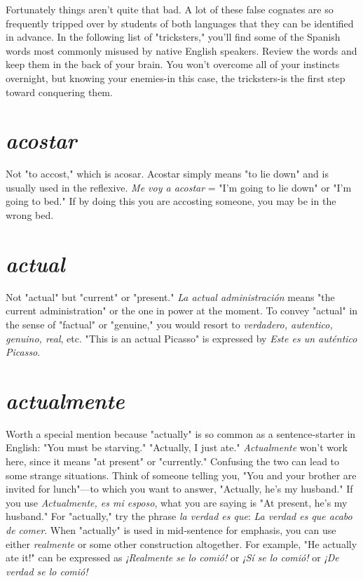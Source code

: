 \documentclass[14pt,a4paper,oneside]{memoir}
\begin{document}
Fortunately things aren't quite that bad. A lot of these false
cognates are so frequently tripped over by students of both languages
that they can be identified in advance. In the following list of "tricksters," you'll find some of the Spanish words most commonly misused
by native English speakers. Review the words and keep them in the
back of your brain. You won't overcome all of your instincts overnight,
but knowing your enemies-in this case, the tricksters-is the first
step toward conquering them.

\section{\emph{acostar}}

Not "to accost," which is acosar. Acostar simply
means "to lie down" and is usually used in the reflexive. \emph{Me voy a
acostar} = "I'm going to lie down" or "I'm going to bed." If by doing
this you are accosting someone, you may be in the wrong bed.

\section{\emph{actual}}

Not "actual" but "current" or "present." \emph{La actual
administración} means "the current administration" or the one in power
at the moment. To convey "actual" in the sense of "factual" or "genuine," you would resort to \emph{verdadero, autentico, genuino, real}, etc. "This
is an actual Picasso" is expressed by \emph{Este es un auténtico Picasso}.

\section{\emph{actualmente}}

Worth a special mention because "actually"
is so common as a sentence-starter in English: "You must be starving."
"Actually, I just ate." \emph{Actualmente} won't work here, since it means
"at present" or "currently." Confusing the two can lead to some
strange situations. Think of someone telling you, "You and your
brother are invited for lunch"---to which you want to answer, "Actually, he's my husband." If you use \emph{Actualmente, es mi esposo}, what
you are saying is "At present, he's my husband." For "actually," try the
phrase \emph{la verdad es que}: \emph{La verdad es que acabo de comer}. When "actually" is used in mid-sentence for emphasis, you can use either
\emph{realmente} or some other construction altogether. For example, "He actually ate it!" can be expressed as \emph{¡Realmente se lo comió!} or \emph{¡Sí se lo
comió!} or \emph{¡De verdad se lo comió!}
\end{document}

